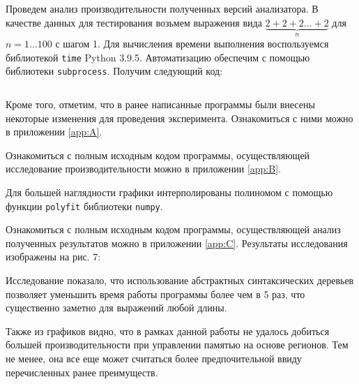 Проведем анализ производительности полученных версий анализатора. В
качестве данных для тестирования возьмем выражения вида 
$\underbrace{2+2+2 \dots +2}_n$ для $n = 1 \dots 100$ с шагом 1. 
Для вычисления времени выполнения воспользуемся библиотекой \verb|time|
Python 3.9.5. Автоматизацию обеспечим с помощью библиотеки \verb|subprocess|.
Получим следующий код:
\inputminted{Python}{test.py}
Кроме того, отметим, что в ранее написанные программы были внесены некоторые
изменения для проведения эксперимента. Ознакомиться с ними
можно в приложении \ref{app:A}.

Ознакомиться с полным исходным кодом программы, осуществляющей
исследование производительности можно в приложении \ref{app:B}.

Для большей наглядности графики интерполированы полиномом с помощью функции
\verb|polyfit| библиотеки \verb|numpy|.

Ознакомиться с полным исходным кодом программы, осуществляющей
анализ полученных результатов можно в приложении \ref{app:C}.
Результаты исследования изображены на рис. 7:

Исследование показало, что использование абстрактных синтаксических
деревьев позволяет уменьшить время работы программы более чем в 5 раз, что
существенно заметно для выражений любой длины.

Также из графиков видно, что в рамках данной работы не удалось добиться большей
производительности при управлении памятью на основе регионов.
Тем не менее, она все еще может считаться более предпочительной ввиду
перечисленных ранее преимуществ.